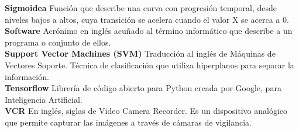 \documentclass[a4paper,12pt,oneside,spanish]{book}
\begin{document}
\textbf{Sigmoidea} Función que describe una curva con progresión temporal, desde niveles bajos a altos, cuya transición se acelera cuando el valor X se acerca a 0.\\

\textbf{Software} Acrónimo en inglés acuñado al término informático que describe a un programa o conjunto de ellos.\\

\textbf{Support Vector Machines (SVM)} Traducción al inglés de Máquinas de Vectores Soporte. Técnica de clasificación que utiliza hiperplanos para separar la información.\\

\textbf{Tensorflow} Librería de código abierto para Python creada por Google, para Inteligencia Artificial.\\

\textbf{VCR} En inglés, siglas de Video Camera Recorder. Es un dispositivo analógico que permite capturar las imágenes a través de cámaras de vigilancia. \\


\newpage	
\end{document}
